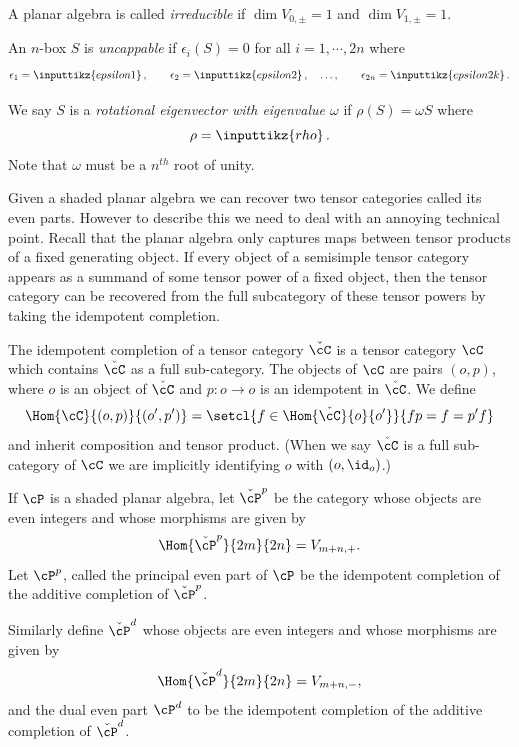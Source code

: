 
\begin{defn}
A planar algebra is called \emph{irreducible} if $\dim V_{0,\pm} = 1$ and $\dim V_{1,\pm} = 1$.
\end{defn}

\begin{defn}\label{defn:uncappable}
An $n$-box $S$ is {\em uncappable}  if $\epsilon_i(S)=0$ for all $i=1,\cdots, 2n$ where
 $$\epsilon_1 = \inputtikz{epsilon1} \, , \qquad 
 \epsilon_2 = \inputtikz{epsilon2} \, , \quad \ldots , \qquad 
 \epsilon_{2n}= \inputtikz{epsilon2k} \, . $$
 
 We say $S$ is a {\em rotational eigenvector with eigenvalue $\omega$} if   $\rho(S)= \omega S$ where
  $$\rho=\inputtikz{rho} \, .$$
 Note that $\omega$ must be a $n^{th}$ root of unity.
\end{defn}

Given a shaded planar algebra we can recover two tensor categories called its even parts.  However to describe this we need to deal with an annoying technical point.  Recall that the planar algebra only captures maps between tensor products of a fixed generating object.  If every object of a semisimple tensor category appears as a summand of some tensor power of a fixed object, then the tensor category can be recovered from the full subcategory of these tensor powers by taking the idempotent completion.

\begin{defn}
The idempotent completion of a tensor category $\check{\cC}$ is a tensor category $\cC$ which contains $\check{\cC}$ as a full sub-category. The objects of $\cC$ are pairs $(o,p)$, where $o$ is an object of $\check{\cC}$ and $p:o \to o$ is an idempotent in $\check{\cC}$.  We define $$\Hom{\cC}{(o,p)}{(o',p')} = \setcl{ f \in \Hom{\check{\cC}}{o}{o'} }{ f p = f = p' f}$$ and inherit composition and tensor product.  (When we say $\check{\cC}$ is a full sub-category of $\cC$ we are implicitly identifying $o$ with $(o,\id_o)$.)
\end{defn}


\begin{defn}
If $\cP$ is a shaded planar algebra, let $\check{\cP}^p$ be the category whose objects are even integers and whose morphisms are given by
$$\Hom{\check{\cP}^p}{2m}{2n} = V_{m+n,+}.$$
 Let $\cP^p$, called the principal even part of $\cP$ be the idempotent completion of the additive completion of $\check{\cP}^p$.

Similarly define $\check{\cP}^d$ whose objects are even integers and whose morphisms are given by
$$\Hom{\check{\cP}^d}{2m}{2n} = V_{m+n,-},$$ and the dual even part $\cP^d$ to be the idempotent completion of the additive completion of $\check{\cP}^d$.
\end{defn}

